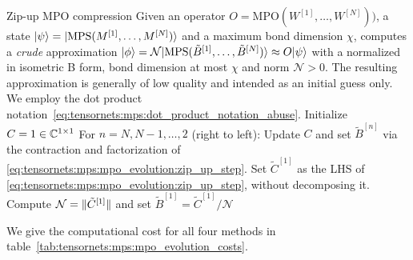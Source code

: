 \begin{Algorithm}{Zip-up MPO compression}{
    Given an operator $O = \text{MPO}(W^{[1]}, \dots, W^{[N]}))$, a state $\psiket = \ket{\text{MPS}(M^{[1]}, \dots, M^{[N]})}$ and a maximum bond dimension $\chi$, computes a \emph{crude}  approximation $\ket{\phi} = \mathcal{N} \ket{\text{MPS}(\tilde{B}^{[1]}, \dots, \tilde{B}^{[N]})} \approx O\psiket$ with a normalized  in isometric B form, bond dimension at most $\chi$ and norm $\mathcal{N} > 0$.
    The resulting approximation is generally of low quality and intended as an initial guess only.
    We employ the dot product notation~\eqref{eq:tensornets:mps:dot_product_notation_abuse}.
    \label{algo:tensornets:mps:mpo_evolution_zip_up}
}
    \step Initialize $C = 1 \in\mathbb{C}^{1\times 1}$
    \step For $n = N,N-1,\dots,2$ (right to left):
    \step \quad Update $C$ and set $\tilde{B}^{[n]}$ via the contraction and factorization of \eqref{eq:tensornets:mps:mpo_evolution:zip_up_step}.
    \step Set $\tilde{C}^{[1]}$ as the LHS of \eqref{eq:tensornets:mps:mpo_evolution:zip_up_step}, without decomposing it.
    \step Compute $\mathcal{N} = \norm{\tilde{C}^{[1]}}$ and set $\tilde{B}^{[1]} = \tilde{C}^{[1]} / \mathcal{N}$
\end{Algorithm}


We give the computational cost for all four methods in table~\ref{tab:tensornets:mps:mpo_evolution_costs}.

